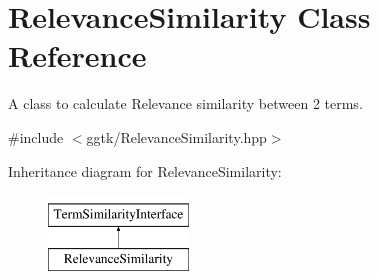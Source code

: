 \hypertarget{classRelevanceSimilarity}{}\section{Relevance\+Similarity Class Reference}
\label{classRelevanceSimilarity}


A class to calculate Relevance similarity between 2 terms.  




{\ttfamily \#include $<$ggtk/\+Relevance\+Similarity.\+hpp$>$}

Inheritance diagram for Relevance\+Similarity\+:\begin{figure}[H]
\begin{center}
\leavevmode
\includegraphics[height=2.000000cm]{classRelevanceSimilarity}
\end{center}
\end{figure}
